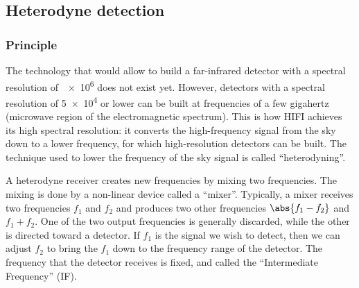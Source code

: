\subsection{Heterodyne detection}


\subsubsection{Principle}
The technology that would allow to build a far-infrared detector with a spectral resolution of~\num{e6} does not exist yet.
However, detectors with a spectral resolution of \num{5e4} or lower can be built at frequencies of a few gigahertz (microwave region of the electromagnetic spectrum).
This is how HIFI achieves its high spectral resolution: it converts the high-frequency signal from the sky down to a lower frequency, for which high-resolution detectors can be built.
The technique used to lower the frequency of the sky signal is called ``heterodyning''.

A heterodyne receiver creates new frequencies by mixing two frequencies.
The mixing is done by a non-linear device called a ``mixer''.
Typically, a mixer receives two frequencies $f_1$ and $f_2$ and produces two other frequencies $\abs{f_1-f_2}$ and $f_1+f_2$.
One of the two output frequencies is generally discarded, while the other is directed toward a detector.
If $f_1$ is the signal we wish to detect, then we can adjust $f_2$ to bring the $f_1$ down to the frequency range of the detector.
The frequency that the detector receives is fixed, and called the ``Intermediate Frequency'' (IF).

